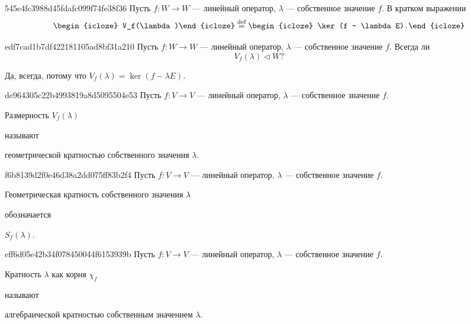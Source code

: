 \begin{note}{545e4fc3988d45fdafc099f74fe38f36}
    Пусть \( f : W \to W \) --- линейный оператор, \( \lambda \) --- собственное значение \( f \).
    В кратком выражении
    \[
        \begin{icloze}{2}V_f(\lambda)\end{icloze} \overset{\text{def}}= \begin{icloze}{1}\ker (f - \lambda E).\end{icloze}
    \]
\end{note}

\begin{note}{edf7cad1b7df422181105ad8bf31a210}
    Пусть \( f : W \to W \) --- линейный оператор, \( \lambda \) --- собственное значение \( f \).
    Всегда ли
    \[
        V_{f} (\lambda) \triangleleft W?
    \]

    \begin{cloze}{1}
        Да, всегда, потому что \( V_{f} (\lambda) = \ker (f - \lambda E) \).
    \end{cloze}
\end{note}

\begin{note}{de964305c22b4993819a8d5095504e53}
    Пусть \( f : V \to V \) --- линейный оператор, \( \lambda \) --- собственное значение \( f \).
    \begin{icloze}{1}Размерность \( V_f (\lambda) \)\end{icloze} называют \begin{icloze}{2}геометрической кратностью собственного значения \( \lambda \).\end{icloze}
\end{note}

\begin{note}{f6b8139d2f0e46d38a2dd075ff83b2f4}
    Пусть \( f : V \to V \) --- линейный оператор, \( \lambda \) --- собственное значение \( f \).
    \begin{icloze}{2}Геометрическая кратность собственного значения \( \lambda \)\end{icloze} обозначается \begin{icloze}{1}\( S_f (\lambda) \).\end{icloze}
\end{note}

\begin{note}{eff6d05e42b34f078450044f6153939b}
    Пусть \( f : V \to V \) --- линейный оператор, \( \lambda \) --- собственное значение \( f \).
    \begin{icloze}{1}Кратность \( \lambda \) как корня \( \chi_f \)\end{icloze} называют \begin{icloze}{2}алгебраической кратностью собственным значением \( \lambda \).\end{icloze}
\end{note}

